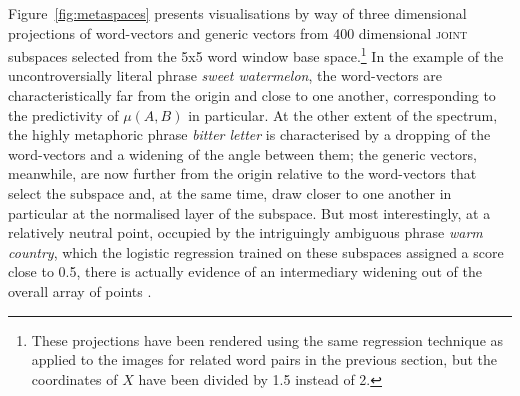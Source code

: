 Figure~\ref{fig:metaspaces} presents visualisations by way of three dimensional projections of word-vectors and generic vectors from 400 dimensional \textsc{joint} subspaces selected from the 5x5 word window base space.\footnote{These projections have been rendered using the same regression technique as applied to the images for related word pairs in the previous section, but the coordinates of $X$ have been divided by 1.5 instead of 2.}    In the example of the uncontroversially literal phrase \emph{sweet watermelon}, the word-vectors are characteristically far from the origin and close to one another, corresponding to the predictivity of $\mu(A,B)$ in particular.  At the other extent of the spectrum, the highly metaphoric phrase \emph{bitter letter} is characterised by a dropping of the word-vectors and a widening of the angle between them; the generic vectors, meanwhile, are now further from the origin relative to the word-vectors that select the subspace and, at the same time, draw closer to one another in particular at the normalised layer of the subspace.  But most interestingly, at a relatively neutral point, occupied by the intriguingly ambiguous phrase \emph{warm country}, which the logistic regression trained on these subspaces assigned a score close to 0.5, there is actually evidence of an intermediary widening out of the overall array of points  .

